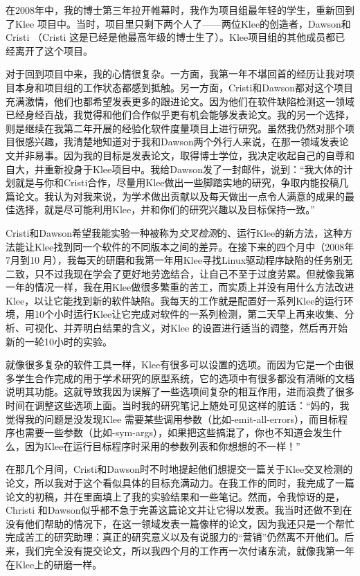 \documentclass[letter,12pt]{book}
\begin{document}
\begin{CJK}{UTF8}{gbsn}

在2008年中，我的博士第三年拉开帷幕时，我作为项目组最年轻的学生，重新回到了Klee 项目中。当时，项目里只剩下两个人了——两位Klee的创造者，Dawson和Cristi （Cristi 这是已经是他最高年级的博士生了）。Klee项目组的其他成员都已经离开了这个项目。

对于回到项目中来，我的心情很复杂。一方面，我第一年不堪回首的经历让我对项目本身和项目组的工作状态都感到抵触。另一方面，Cristi和Dawson都对这个项目充满激情，他们也都希望发表更多的跟进论文。因为他们在软件缺陷检测这一领域已经身经百战，我觉得和他们合作似乎更有机会能够发表论文。我的另一个选择，则是继续在我第二年开展的经验化软件度量项目上进行研究。虽然我仍然对那个项目很感兴趣，我清楚地知道对于我和Dawson两个外行人来说，在那一领域发表论文并非易事。因为我的目标是发表论文，取得博士学位，我决定收起自己的自尊和自大，并重新投身于Klee项目中。我给Dawson发了一封邮件，说到：“我大体的计划就是与你和Cristi合作，尽量用Klee做出一些脚踏实地的研究，争取内能投稿几篇论文。我认为对我来说，为学术做出贡献以及每天做出一点令人满意的成果的最佳选择，就是尽可能利用Klee，并和你们的研究兴趣以及目标保持一致。”

\breakline

Cristi和Dawson希望我能实验一种被称为\emph{交叉检测}的、运行Klee的新方法，这种方法能让Klee找到同一个软件的不同版本之间的差异。在接下来的四个月中（2008年7月到10 月），我每天的研磨和我第一年用Klee寻找Linux驱动程序缺陷的任务别无二致，只不过我现在学会了更好地劳逸结合，让自己不至于过度劳累。但就像我第一年的情况一样，我在用Klee做很多繁重的苦工，而实质上并没有用什么方法改进Klee，以让它能找到新的软件缺陷。我每天的工作就是配置好一系列Klee的运行环境，用10个小时运行Klee让它完成对软件的一系列检测，第二天早上再来收集、分析、可视化、并弄明白结果的含义，对Klee 的设置进行适当的调整，然后再开始新的一轮10小时的实验。

就像很多复杂的软件工具一样，Klee有很多可以设置的选项。而因为它是一个由很多学生合作完成的用于学术研究的原型系统，它的选项中有很多都没有清晰的文档说明其功能。这就导致我因为误解了一些选项间复杂的相互作用，进而浪费了很多时间在调整这些选项上面。当时我的研究笔记上随处可见这样的脏话：“妈的，我觉得我的问题是没发现Klee 需要某些调用参数（比如-emit-all-errors），而目标程序也需要一些参数（比如-sym-args），如果把这些搞混了，你也不知道会发生什么，因为Klee在运行目标程序时采用的参数列表和你想想的不一样！”

在那几个月间，Cristi和Dawson时不时地提起他们想提交一篇关于Klee交叉检测的论文，所以我对于这个看似具体的目标充满动力。在我工作的同时，我完成了一篇论文的初稿，并在里面填上了我的实验结果和一些笔记。然而，令我惊讶的是，Christi 和Dawson似乎都不急于完善这篇论文并让它得以发表。我当时还做不到在没有他们帮助的情况下，在这一领域发表一篇像样的论文，因为我还只是一个帮忙完成苦工的研究助理：真正的研究意义以及有说服力的“营销”仍然离不开他们。后来，我们完全没有提交论文，所以我四个月的工作再一次付诸东流，就像我第一年在Klee上的研磨一样。


\end{CJK}
\end{document}
